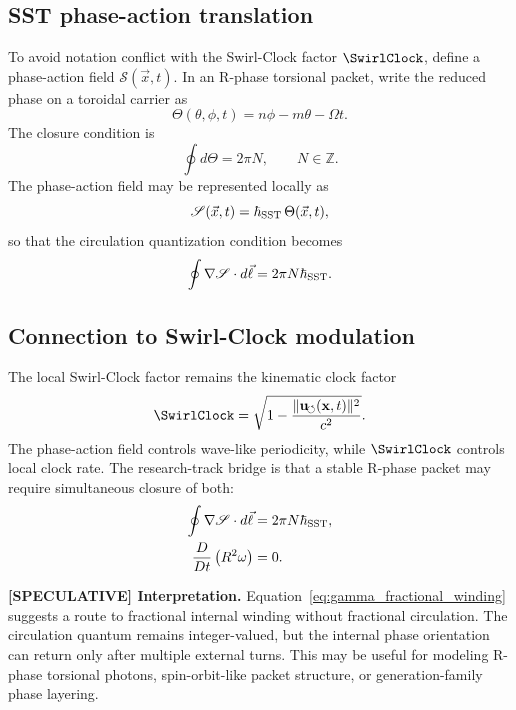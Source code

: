 \subsection{SST phase-action translation}
To avoid notation conflict with the Swirl-Clock factor $\SwirlClock$, define a phase-action field $\mathscr S(\vec x,t)$. In an R-phase torsional packet, write the reduced phase on a toroidal carrier as
\begin{equation}
    \Theta(\theta,\phi,t)
    = n\phi-m\theta-\Omega t.
    \label{eq:sst_torus_phase}
\end{equation}
The closure condition is
\begin{equation}
    \oint d\Theta = 2\pi N,
    \qquad N\in\mathbb Z.
    \label{eq:phase_closure_condition}
\end{equation}
The phase-action field may be represented locally as
\begin{equation}
    \mathscr S(\vec x,t)=\hbar_{\rm SST}\,\Theta(\vec x,t),
    \label{eq:phase_action_relation}
\end{equation}
so that the circulation quantization condition becomes
\begin{equation}
    \oint \nabla\mathscr S\cdot d\vec\ell
    =2\pi N\hbar_{\rm SST}.
    \label{eq:phase_action_quantization}
\end{equation}

\subsection{Connection to Swirl-Clock modulation}
The local Swirl-Clock factor remains the kinematic clock factor
\begin{equation}
    \SwirlClock
    =\sqrt{1-\frac{\lVert\uswirl(\mathbf{x},t)\rVert^2}{c^2}}.
    \label{eq:swirl_clock_factor_appendix}
\end{equation}
The phase-action field controls wave-like periodicity, while $\SwirlClock$ controls local clock rate. The research-track bridge is that a stable R-phase packet may require simultaneous closure of both:
\begin{align}
    \oint \nabla\mathscr S\cdot d\vec\ell &=2\pi N\hbar_{\rm SST},\label{eq:phase_closure}\\
    \frac{D}{Dt}\left(R^2\omega\right)&=0.\label{eq:kelvin_closure}
\end{align}

\textbf{[SPECULATIVE] Interpretation.}
Equation~\eqref{eq:gamma_fractional_winding} suggests a route to fractional internal winding without fractional circulation. The circulation quantum remains integer-valued, but the internal phase orientation can return only after multiple external turns. This may be useful for modeling R-phase torsional photons, spin-orbit-like packet structure, or generation-family phase layering.

